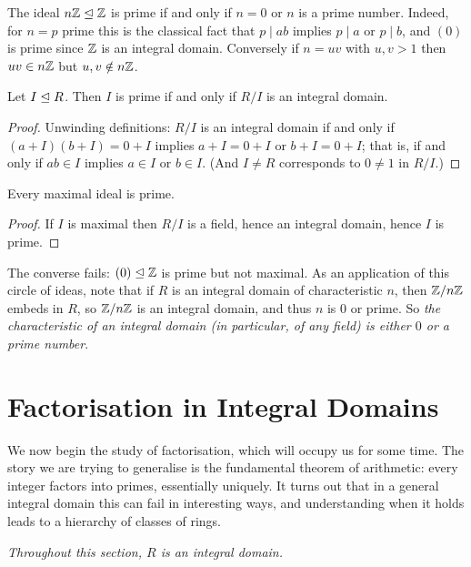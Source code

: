 \documentclass[a4paper]{scrartcl}
\begin{document}
\begin{example}
	The ideal $n\mathbb{Z} \trianglelefteq \mathbb{Z}$ is prime if and only if $n = 0$ or $n$ is a prime number. Indeed, for $n = p$ prime this is the classical fact that $p \mid ab$ implies $p \mid a$ or $p \mid b$, and $(0)$ is prime since $\mathbb{Z}$ is an integral domain. Conversely if $n = uv$ with $u, v > 1$ then $uv \in n\mathbb{Z}$ but $u, v \notin n\mathbb{Z}$.
\end{example}

\begin{proposition}
	Let $I \trianglelefteq R$. Then $I$ is prime if and only if $R/I$ is an integral domain.
\end{proposition}
\begin{proof}
	Unwinding definitions: $R/I$ is an integral domain if and only if $(a + I)(b + I) = 0 + I$ implies $a + I = 0 + I$ or $b + I = 0 + I$; that is, if and only if $ab \in I$ implies $a \in I$ or $b \in I$. (And $I \neq R$ corresponds to $0 \neq 1$ in $R/I$.)
\end{proof}

\begin{corollary}
	Every maximal ideal is prime.
\end{corollary}
\begin{proof}
	If $I$ is maximal then $R/I$ is a field, hence an integral domain, hence $I$ is prime.
\end{proof}

The converse fails: $(0) \trianglelefteq \mathbb{Z}$ is prime but not maximal. As an application of this circle of ideas, note that if $R$ is an integral domain of characteristic $n$, then $\mathbb{Z}/n\mathbb{Z}$ embeds in $R$, so $\mathbb{Z}/n\mathbb{Z}$ is an integral domain, and thus $n$ is $0$ or prime. So \emph{the characteristic of an integral domain (in particular, of any field) is either $0$ or a prime number}.

\section{Factorisation in Integral Domains}

We now begin the study of factorisation, which will occupy us for some time. The story we are trying to generalise is the fundamental theorem of arithmetic: every integer factors into primes, essentially uniquely. It turns out that in a general integral domain this can fail in interesting ways, and understanding when it holds leads to a hierarchy of classes of rings.

\emph{Throughout this section, $R$ is an integral domain.}
\end{document}
